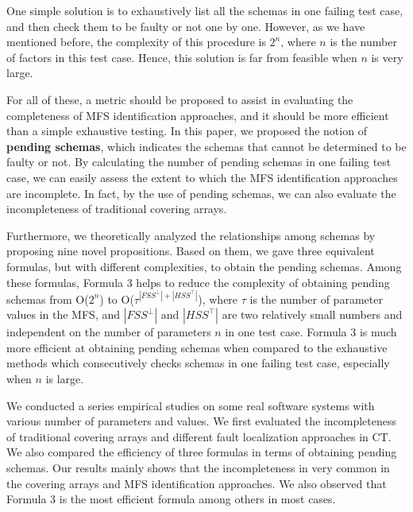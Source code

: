 One simple solution is to exhaustively list all the schemas in one failing test case, and then check them to be faulty or not one by one. However, as we have mentioned before, the complexity of this procedure is $2^{n}$, where $n$ is the number of factors in this test case. Hence, this solution is far from feasible when $n$ is very large.

For all of these, a metric should be proposed to assist in evaluating the completeness of MFS identification approaches, and it should be more efficient than a simple exhaustive testing. In this paper, we proposed the notion of \textbf{pending schemas}, which indicates the schemas that cannot be determined to be faulty or not. By calculating the number of pending schemas in one failing test case, we can easily assess the extent to which the MFS identification approaches are incomplete. In fact, by the use of pending schemas, we can also evaluate the incompleteness of traditional covering arrays.

Furthermore, we theoretically analyzed the relationships among schemas by proposing nine novel propositions. Based on them, we gave three equivalent formulas, but with different complexities, to obtain the pending schemas. Among these formulas, Formula 3 helps to reduce the complexity of obtaining pending schemas from O($2^{n}$) to O($ \tau^{|FSS^{\bot}|+|HSS^{\top}|}$), where $\tau$ is the number of parameter values in the MFS, and $|FSS^{\bot}|$ and $|HSS^{\top}|$ are two relatively small numbers and independent on the number of parameters $n$ in one test case. Formula 3 is much more efficient at obtaining pending schemas when compared to the exhaustive methods which consecutively checks schemas in one failing test case, especially when $n$ is large.


We conducted a series empirical studies on some real software systems with various number of parameters and values. We first evaluated the incompleteness of traditional covering arrays and different fault localization approaches in CT. We also compared the efficiency of three formulas in terms of obtaining pending schemas. Our results mainly shows that the incompleteness in very common in the covering arrays and  MFS identification approaches. We also observed that Formula 3 is the most efficient formula among others in most cases.

